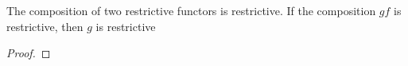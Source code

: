 \begin{lemma}
The composition of two restrictive functors is restrictive. 
If the composition $gf$ is restrictive, then $g$ is restrictive
\end{lemma}
\begin{proof}
\end{proof}